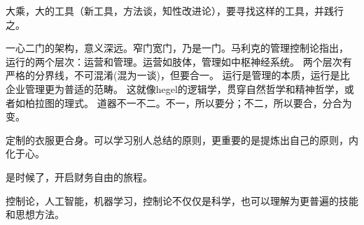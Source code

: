 大乘，大的工具（新工具，方法谈，知性改进论），要寻找这样的工具，并践行之。

一心二门的架构，意义深远。窄门宽门，乃是一门。马利克的管理控制论指出，
运行的两个层次：运营和管理。运营如肢体，管理如中枢神经系统。
两个层次有严格的分界线，不可混淆(混为一谈)，但要合一。
运行是管理的本质，运行是比企业管理更为普适的范畴。
这就像hegel的逻辑学，贯穿自然哲学和精神哲学，或者如柏拉图的理式。
道器不一不二。不一，所以要分；不二，所以要合，分合为变。

定制的衣服更合身。可以学习别人总结的原则，更重要的是提炼出自己的原则，内化于心。

是时候了，开启财务自由的旅程。

控制论，人工智能，机器学习，控制论不仅仅是科学，也可以理解为更普遍的技能和思想方法。
